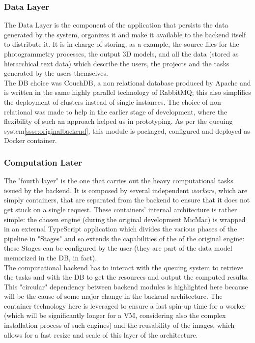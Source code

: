   \subsubsection{Data Layer}
  \label{ssse:originaldatalayer}
    The Data Layer is the component of the application that persists the data generated by the system, organizes it and make it available to the backend itself to distribute it. It is in charge of storing, as a example, the source files for the photogrammetry processes, the output 3D models, and all the data (stored as hierarchical text data) which describe the users, the projects and the tasks generated by the users themselves.\\
    The DB choice was CouchDB, a non relational database produced by Apache and is written in the same highly parallel technology of RabbitMQ; this also simplifies the deployment of clusters instead of single instances. The choice of non-relational was made to help in the earlier stage of development, where the flexibility of such an approach helped us in prototyping. As per the queuing system\ref{ssse:originalbackend}, this module is packaged, configured and deployed as Docker container.
    
  \subsubsection{Computation Later}
  \label{ssse:originalcomputationlayer}
    The "fourth layer" is the one that carries out the heavy computational tasks issued by the backend. It is composed by several independent \textit{workers}, which are simply containers, that are separated from the backend to ensure that it does not get stuck on a single request. These containers' internal architecture is rather simple: the chosen engine (during the original development MicMac) is wrapped in an external TypeScript application which divides the various phases of the pipeline in "Stages" and so extends the capabilities of the of the original engine: these Stages can be configured by the user (they are part of the data model memorized in the DB, in fact).\\
    The computational backend has to interact with the queuing system to retrieve the tasks and with the DB to get the resources and output the computed results. This "circular" dependency between backend modules is highlighted here because will be the cause of some major change in the backend architecture. The container technology here is leveraged to ensure a fast spin-up time for a worker (which will be significantly longer for a VM, considering also the complex installation process of such engines) and the reusability of the images, which allows for a fast resize and scale of this layer of the architecture.

